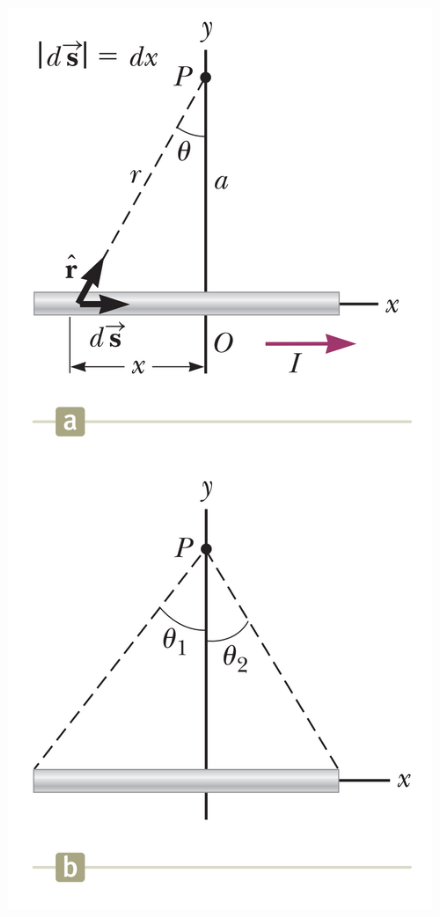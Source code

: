 \documentclass[12pt, titlepage, oneside]{article}
\begin{document}
\begin{figure}
	\begin{center}
		\includegraphics[scale=.4]{2.png}
	\end{center}
\end{figure}
\end{document}
